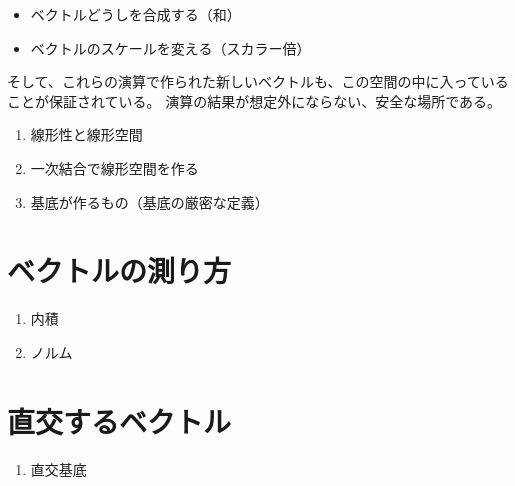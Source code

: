 \documentclass[../imaging-math]{subfiles}
\begin{document}
\begin{itemize}
  \item ベクトルどうしを合成する（和）
  \item ベクトルのスケールを変える（スカラー倍）
\end{itemize}

そして、これらの演算で作られた新しいベクトルも、この空間の中に入っていることが保証されている。
演算の結果が想定外にならない、安全な場所である。

\wip

\begin{mindflow}
  \begin{enumerate}
    \item 線形性と線形空間
    \item 一次結合で線形空間を作る
    \item 基底が作るもの（基底の厳密な定義）
  \end{enumerate}
\end{mindflow}

\section{ベクトルの測り方}

\begin{mindflow}
  \begin{enumerate}
    \item 内積
    \item ノルム
  \end{enumerate}
\end{mindflow}

\section{直交するベクトル}

\begin{mindflow}
  \begin{enumerate}
    \item 直交基底
  \end{enumerate}
\end{mindflow}
\end{document}
